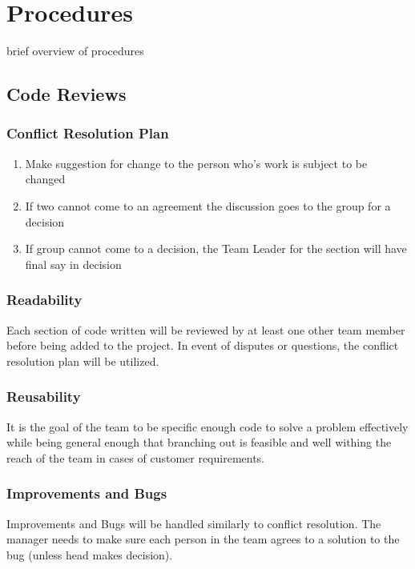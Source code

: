 \documentclass[11pt, titlepage]{article}
\begin{document}
    \section{Procedures}
    	\tab brief overview of procedures
    \subsection{Code Reviews}
   		\subsubsection{Conflict Resolution Plan}

        \begin{enumerate}
				\item Make suggestion for change to the person who's work is subject to be 	changed
        \item If two cannot come to an agreement the discussion goes to the group for a	decision
        \item If group cannot come to a decision, the Team Leader for the section will have final say in decision
		\end{enumerate}

    \subsubsection{Readability}
	    Each section of code written will be reviewed by at least one other team member before being added to the project.  In event of disputes or questions, the conflict resolution plan will be utilized.
    \subsubsection{Reusability}
	    It is the goal of the team to be specific enough code to solve a problem effectively while being general enough that branching out is feasible and well withing the reach of the team in cases of customer requirements.

    \subsubsection{Improvements and Bugs}

    	Improvements and Bugs will be handled similarly to conflict resolution.  The manager needs to make sure each person in the team agrees to a solution to the bug (unless head makes decision).
\end{document}
